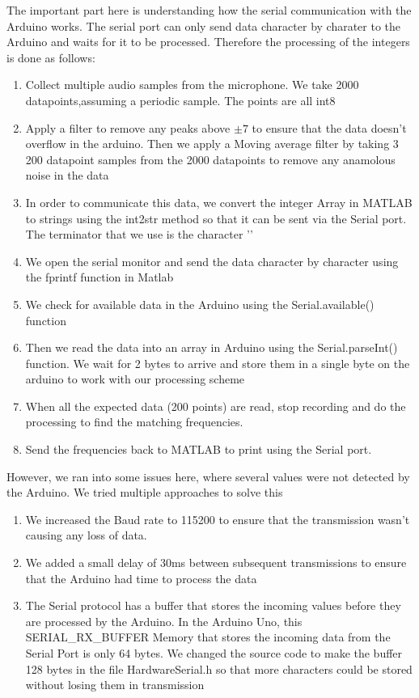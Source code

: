 The important part here is understanding how the serial communication with the Arduino works. The serial port can only send data character by charater to the Arduino and waits for it to be processed. Therefore the processing of the integers is done as follows: 
\begin{enumerate}
    \item Collect multiple audio samples from the microphone. We take 2000 datapoints,assuming a periodic sample. The points are all int8
    \item Apply a filter to remove any peaks above \(\pm7\) to ensure that the data doesn't overflow in the arduino. Then we apply a Moving average filter by taking 3 200 datapoint samples from the 2000 datapoints to remove any anamolous noise in the data
    \item In order to communicate this data, we convert the integer Array in MATLAB to strings using the int2str method so that it can be sent via the Serial port. The terminator that we use is the character '\n'
    \item We open the serial monitor and send the data character by character using the fprintf function in Matlab
    \item We check for available data in the Arduino using the Serial.available() function
    \item Then we read the data into an array in Arduino using the Serial.parseInt() function. We wait for 2 bytes to arrive and store them in a single byte on the arduino to work with our processing scheme
    \item When all the expected data (200 points) are read, stop recording and do the processing to find the matching frequencies. 
    \item Send the frequencies back to MATLAB to print using the Serial port. 
\end{enumerate}
However, we ran into some issues here, where several values were not detected by the Arduino. We tried multiple approaches to solve this 
\begin{enumerate}
    \item We increased the Baud rate to 115200 to ensure that the transmission wasn't causing any loss of data. 
    \item We added a small delay of 30ms between subsequent transmissions to ensure that the Arduino had time to process the data
    \item The Serial protocol has a buffer that stores the incoming values before they are processed by the Arduino. In the Arduino Uno, this SERIAL_RX_BUFFER Memory that stores the incoming data from the Serial Port is only 64 bytes. We changed the source code to make the buffer 128 bytes in the file HardwareSerial.h so that more characters could be stored without losing them in transmission
\end{enumerate}
